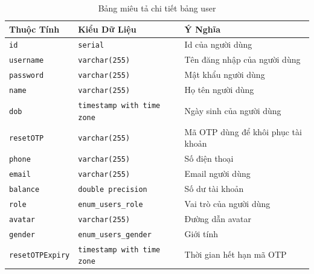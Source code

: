 \documentclass[../DoAn.tex]{subfiles}
\begin{document}
\begin{table}[H]
\centering
\small
\renewcommand{\arraystretch}{1.2}
\begin{tabular}{|l|p{4.5cm}|p{7.5cm}|}
\hline
\textbf{Thuộc Tính} & \textbf{Kiểu Dữ Liệu} & \textbf{Ý Nghĩa} \\ \hline
\texttt{id} & \texttt{serial} & Id của người dùng \\ \hline
\texttt{username} & \texttt{varchar(255)} & Tên đăng nhập của người dùng \\ \hline
\texttt{password} & \texttt{varchar(255)} & Mật khẩu người dùng \\ \hline
\texttt{name} & \texttt{varchar(255)} & Họ tên người dùng \\ \hline
\texttt{dob} & \texttt{timestamp with time zone} & Ngày sinh của người dùng \\ \hline
\texttt{resetOTP} & \texttt{varchar(255)} & Mã OTP dùng để khôi phục tài khoản \\ \hline
\texttt{phone} & \texttt{varchar(255)} & Số điện thoại \\ \hline
\texttt{email} & \texttt{varchar(255)} & Email người dùng \\ \hline
\texttt{balance} & \texttt{double precision} & Số dư tài khoản \\ \hline
\texttt{role} & \texttt{enum\_users\_role} & Vai trò của người dùng \\ \hline
\texttt{avatar} & \texttt{varchar(255)} & Đường dẫn avatar \\ \hline
\texttt{gender} & \texttt{enum\_users\_gender} & Giới tính \\ \hline
\texttt{resetOTPExpiry} & \texttt{timestamp with time zone} & Thời gian hết hạn mã OTP \\ \hline
\end{tabular}
\caption{Bảng miêu tả chi tiết bảng user}
\label{tab:user_details}
\end{table}
\end{document}
